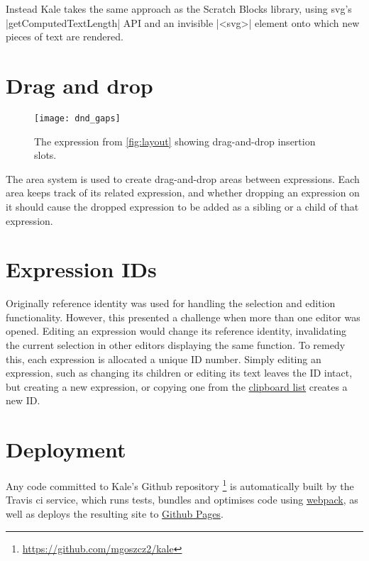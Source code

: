 Instead Kale takes the same approach as the Scratch Blocks \cite{ScratchBlocks}
library, using \ac{svg}'s |getComputedTextLength| API and an invisible
|<svg>| element onto which new pieces of text are rendered. 



\section{Drag and drop}
\label{impl:dnd}
\begin{wrapfigure}[10]{r}{0pt}
\texttt{[image: dnd\_gaps]}
\caption{The expression from \autoref{fig:layout} showing drag-and-drop
insertion slots.}
\end{wrapfigure}
The area system is used to create drag-and-drop areas between expressions.
Each area keeps track of its related expression, and whether dropping an
expression on it should cause the dropped expression to be added as a
sibling or a child of that expression.


\section{Expression IDs}
Originally reference identity was used for handling the selection and edition
functionality. However, this presented a challenge when more than one editor
was opened. Editing an expression would change its reference identity,
invalidating the current selection in other editors displaying the same
function. To remedy this, each expression is allocated a unique ID number.
Simply editing an expression, such as changing its children or editing its text
leaves the ID intact, but creating a new expression, or copying one from the
\hyperref[soln:clipboard_list]{clipboard list} creates a new ID.



%




\section{Deployment}
Any code committed to Kale's Github repository%
\footnote{\url{https://github.com/mgoszcz2/kale}}
is automatically built by the Travis \ac{ci} service, which runs tests, bundles
and optimises code using \href{https://webpack.js.org/}{webpack},
as well as deploys the resulting site to
\href{https://pages.github.com/}{Github Pages}.
